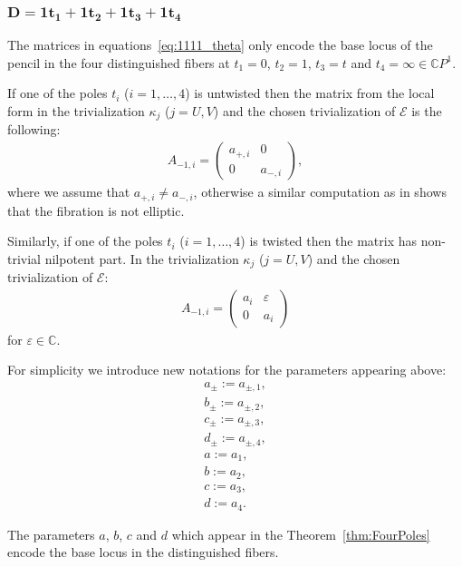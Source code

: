 \documentclass[10pt,a4paper]{amsart}
\newcommand{\C}{{\mathbb C}} %
\newcommand{\CP}[1]{\mathbb{C}P^{#1}} %
\newcommand{\E}{{\mathcal E}} %
\numberwithin{equation}{section}
\begin{document}
\subsubsection[$D=1t_1+1t_2+1t_3+1t_4$]{$\boldsymbol{D=1t_1+1t_2+1t_3+1t_4}$}\label{sssec:1111}
The matrices in equations~\eqref{eq:1111_theta} only encode the base
locus of the pencil in the four distinguished fibers at $t_1=0$, $t_2=1$,
$t_3=t$ and $t_4=\infty \in \CP{1}$.

If one of the poles $t_i$ ($i=1,\dots, 4$) is untwisted then the
matrix from the local form in the trivialization $\kappa_j$ ($j=U,V$) and
the chosen trivialization of $\E$ is the following:
\begin{gather}\label{eq:4poles_ut_u}
 A_{-1,i} = \begin{pmatrix}
 a_{+,i} & 0 \\
 0 & a_{-,i}
 \end{pmatrix},
\end{gather}
where we assume that $a_{+,i}\neq a_{-,i}$, otherwise a similar
 computation as in \cite[Lemma~5.6]{ISS2} shows that the fibration is
 not elliptic.

Similarly, if one of the poles $t_i$ ($i=1,\dots, 4$) is twisted then the
matrix has non-trivial nilpotent part. In the trivialization $\kappa_j$ ($j=U,V$) and the chosen trivialization of $\E$:
\begin{gather}\label{eq:4poles_t_u}
 A_{-1,i} = \begin{pmatrix}
 a_{i} & \varepsilon \\
 0 & a_{i}
 \end{pmatrix}
 \end{gather}
for $\varepsilon \in \C$.

For simplicity we introduce new notations for the parameters appearing above:
\begin{subequations}\label{eq:abcd}
\begin{gather}
a_\pm:= a_{\pm,1}, \\
b_\pm:= a_{\pm,2}, \\
c_\pm:= a_{\pm,3}, \\
d_\pm:= a_{\pm,4}, \\
a:= a_{1}, \\
b:= a_{2}, \\
c:= a_{3}, \\
d:= a_{4}.
\end{gather}
\end{subequations}

The parameters $a$, $b$, $c$ and $d$ which appear in the Theorem~\ref{thm:FourPoles} encode the base locus in the distinguished
fibers.
\end{document}
